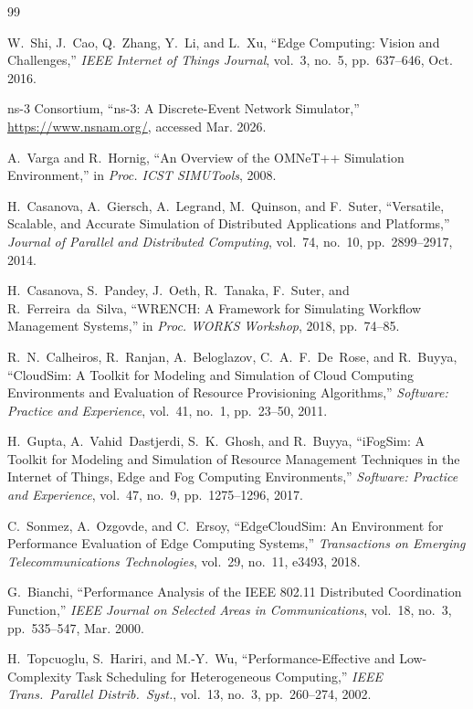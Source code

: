 \documentclass[conference]{IEEEtran}
\begin{document}

\begin{thebibliography}{99}

W.~Shi, J.~Cao, Q.~Zhang, Y.~Li, and L.~Xu,
``Edge Computing: Vision and Challenges,''
\emph{IEEE Internet of Things Journal},
vol.~3, no.~5, pp.~637--646, Oct. 2016.

{ns-3 Consortium},
``ns-3: A Discrete-Event Network Simulator,''
\url{https://www.nsnam.org/}, accessed Mar. 2026.

A.~Varga and R.~Hornig,
``An Overview of the OMNeT++ Simulation Environment,''
in \emph{Proc. ICST SIMUTools}, 2008.

H.~Casanova, A.~Giersch, A.~Legrand, M.~Quinson, and F.~Suter,
``Versatile, Scalable, and Accurate Simulation of Distributed Applications
and Platforms,''
\emph{Journal of Parallel and Distributed Computing},
vol.~74, no.~10, pp.~2899--2917, 2014.

H.~Casanova, S.~Pandey, J.~Oeth, R.~Tanaka, F.~Suter, and R.~Ferreira~da~Silva,
``WRENCH: A Framework for Simulating Workflow Management Systems,''
in \emph{Proc. WORKS Workshop}, 2018, pp.~74--85.

R.~N.~Calheiros, R.~Ranjan, A.~Beloglazov, C.~A.~F.~De~Rose, and R.~Buyya,
``CloudSim: A Toolkit for Modeling and Simulation of Cloud Computing
Environments and Evaluation of Resource Provisioning Algorithms,''
\emph{Software: Practice and Experience},
vol.~41, no.~1, pp.~23--50, 2011.

H.~Gupta, A.~Vahid~Dastjerdi, S.~K.~Ghosh, and R.~Buyya,
``iFogSim: A Toolkit for Modeling and Simulation of Resource Management
Techniques in the Internet of Things, Edge and Fog Computing Environments,''
\emph{Software: Practice and Experience},
vol.~47, no.~9, pp.~1275--1296, 2017.

C.~Sonmez, A.~Ozgovde, and C.~Ersoy,
``EdgeCloudSim: An Environment for Performance Evaluation of Edge Computing
Systems,''
\emph{Transactions on Emerging Telecommunications Technologies},
vol.~29, no.~11, e3493, 2018.

G.~Bianchi,
``Performance Analysis of the IEEE 802.11 Distributed Coordination Function,''
\emph{IEEE Journal on Selected Areas in Communications},
vol.~18, no.~3, pp.~535--547, Mar. 2000.

H.~Topcuoglu, S.~Hariri, and M.-Y.~Wu,
``Performance-Effective and Low-Complexity Task Scheduling for Heterogeneous
Computing,''
\emph{IEEE Trans.\ Parallel Distrib.\ Syst.},
vol.~13, no.~3, pp.~260--274, 2002.


\end{thebibliography}
\end{document}
